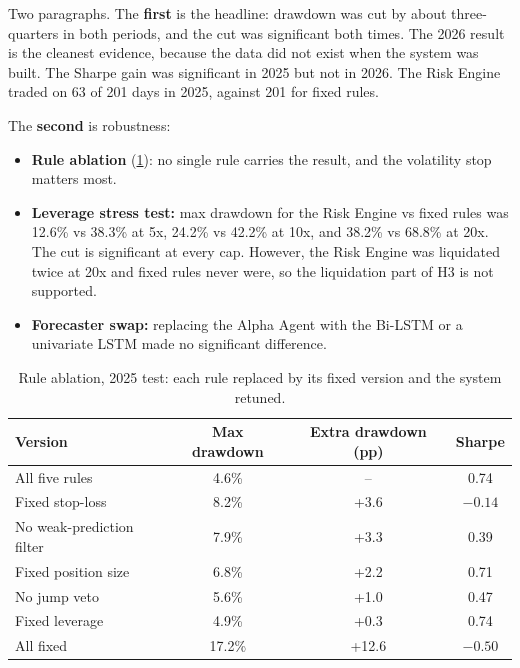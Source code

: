 \begin{guide}
Two paragraphs. The \textbf{first} is the headline: drawdown was cut by about three-quarters in both periods, and the cut was significant both times. The 2026 result is the cleanest evidence, because the data did not exist when the system was built. The Sharpe gain was significant in 2025 but not in 2026. The Risk Engine traded on 63 of 201 days in 2025, against 201 for fixed rules.

The \textbf{second} is robustness:
\begin{itemize}
  \item \textbf{Rule ablation} (\cref{tab:ablation}): no single rule carries the result, and the volatility stop matters most.
  \item \textbf{Leverage stress test:} max drawdown for the Risk Engine vs fixed rules was 12.6\% vs 38.3\% at 5x, 24.2\% vs 42.2\% at 10x, and 38.2\% vs 68.8\% at 20x. The cut is significant at every cap. However, the Risk Engine was liquidated twice at 20x and fixed rules never were, so the liquidation part of H3 is not supported.
  \item \textbf{Forecaster swap:} replacing the Alpha Agent with the Bi-LSTM or a univariate LSTM made no significant difference.
\end{itemize}
\end{guide}
\tbc{}

\begin{table}[ht]
  \centering
  \caption{Rule ablation, 2025 test: each rule replaced by its fixed version and the system retuned.}
  \label{tab:ablation}
  \small
  \begin{tabular}{lccc}
    \toprule
    Version & Max drawdown & Extra drawdown (pp) & Sharpe \\
    \midrule
    All five rules            & 4.6\%  & --    & 0.74 \\
    Fixed stop-loss           & 8.2\%  & +3.6  & $-0.14$ \\
    No weak-prediction filter & 7.9\%  & +3.3  & 0.39 \\
    Fixed position size       & 6.8\%  & +2.2  & 0.71 \\
    No jump veto              & 5.6\%  & +1.0  & 0.47 \\
    Fixed leverage            & 4.9\%  & +0.3  & 0.74 \\
    All fixed                 & 17.2\% & +12.6 & $-0.50$ \\
    \bottomrule
  \end{tabular}
\end{table}

